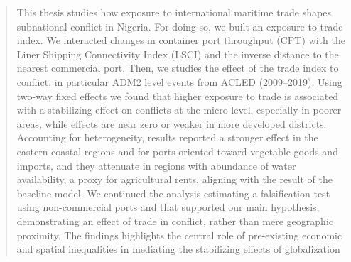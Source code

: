 \begin{abstract}
This thesis studies how exposure to international maritime trade shapes subnational conflict in Nigeria. For doing so, we built an exposure to trade index. We interacted changes in container port throughput (CPT) with the Liner Shipping Connectivity Index (LSCI) and the inverse distance to the nearest commercial port. Then, we studies the effect of the trade index to conflict, in particular ADM2 level events from ACLED (2009–2019). Using two-way fixed effects we found that higher exposure to trade is associated with a stabilizing effect on conflicts at the micro level, especially in poorer areas, while effects are near zero or weaker in more developed districts. Accounting for heterogeneity, results reported a stronger effect in the eastern coastal regions and for ports oriented toward vegetable goods and imports, and they attenuate in regions with abundance of water availability, a proxy for agricultural rents, aligning with the result of the baseline model. We continued the analysis estimating a falsification test using non-commercial ports and that supported our main hypothesis, demonstrating an effect of trade in conflict, rather than mere geographic proximity. The findings highlights the central role of pre-existing economic and spatial inequalities in mediating the stabilizing effects of globalization

\end{abstract}